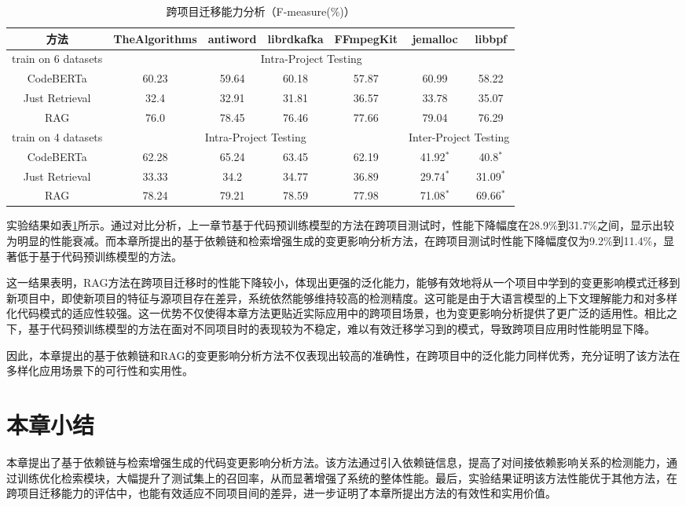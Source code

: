 \begin{table}[htbp]
\caption{跨项目迁移能力分析（F-measure(\%)）}
\label{2_跨项目迁移能力分析}
\vspace{0.5em}\centering\wuhao
\begin{tabular}{c|cccccc}
\toprule
方法& TheAlgorithms & antiword & librdkafka & FFmpegKit & jemalloc & libbpf\\
\midrule
train on 6 datasets & \multicolumn{6}{c}{Intra-Project Testing} \\
\midrule
CodeBERTa  &  60.23 & 59.64 & 60.18 & 57.87 & 60.99 & 58.22 \\
Just Retrieval   & 32.4 & 32.91 & 31.81 & 36.57 & 33.78 & 35.07  \\
RAG & 76.0 & 78.45 & 76.46 & 77.66 & 79.04 & 76.29  \\
\midrule
train on 4 datasets & \multicolumn{4}{c|}{Intra-Project Testing} & \multicolumn{2}{c}{Inter-Project Testing} \\
\midrule
CodeBERTa  &  62.28 & 65.24 & 63.45 & \multicolumn{1}{c|}{62.19} & 41.92$^*$ & 40.8$^*$\\
Just Retrieval   & 33.33 & 34.2 & 34.77 & \multicolumn{1}{c|}{36.89} & 29.74$^*$ & 31.09$^*$ \\
RAG & 78.24 & 79.21 & 78.59 & \multicolumn{1}{c|}{77.98} & 71.08$^*$ & 69.66$^*$ \\
\bottomrule
\end{tabular}
\end{table}


实验结果如表\ref{2_跨项目迁移能力分析}所示。通过对比分析，上一章节基于代码预训练模型的方法在跨项目测试时，性能下降幅度在28.9\%到31.7\%之间，显示出较为明显的性能衰减。而本章所提出的基于依赖链和检索增强生成的变更影响分析方法，在跨项目测试时性能下降幅度仅为9.2\%到11.4\%，显著低于基于代码预训练模型的方法。

这一结果表明，RAG方法在跨项目迁移时的性能下降较小，体现出更强的泛化能力，能够有效地将从一个项目中学到的变更影响模式迁移到新项目中，即使新项目的特征与源项目存在差异，系统依然能够维持较高的检测精度。这可能是由于大语言模型的上下文理解能力和对多样化代码模式的适应性较强。这一优势不仅使得本章方法更贴近实际应用中的跨项目场景，也为变更影响分析提供了更广泛的适用性。相比之下，基于代码预训练模型的方法在面对不同项目时的表现较为不稳定，难以有效迁移学习到的模式，导致跨项目应用时性能明显下降。


因此，本章提出的基于依赖链和RAG的变更影响分析方法不仅表现出较高的准确性，在跨项目中的泛化能力同样优秀，充分证明了该方法在多样化应用场景下的可行性和实用性。
 

\section{本章小结}

本章提出了基于依赖链与检索增强生成的代码变更影响分析方法。该方法通过引入依赖链信息，提高了对间接依赖影响关系的检测能力，通过训练优化检索模块，大幅提升了测试集上的召回率，从而显著增强了系统的整体性能。最后，实验结果证明该方法性能优于其他方法，在跨项目迁移能力的评估中，也能有效适应不同项目间的差异，进一步证明了本章所提出方法的有效性和实用价值。

